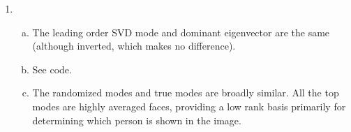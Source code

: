 \documentclass[letter, 12pt]{article}
\begin{document}
\begin{enumerate}
	\item
	\begin{enumerate}[(a)]
	\item The leading order SVD mode and dominant eigenvector are the same (although inverted, which makes no difference).
	\item See code.
	\item The randomized modes and true modes are broadly similar. All the top modes are highly averaged faces, providing a low rank basis primarily for determining which person is shown in the image.
	\end{enumerate}
\end{enumerate}


\pagebreak
\end{document}
